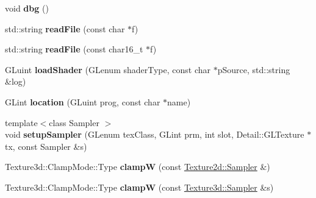 \begin{DoxyCompactItemize}
\item 
\hypertarget{struct_g_l_s_l_1_1_data_a7943d8b7dcde0fd9d68790e71e143011}{void {\bfseries dbg} ()}\label{struct_g_l_s_l_1_1_data_a7943d8b7dcde0fd9d68790e71e143011}

\item 
\hypertarget{struct_g_l_s_l_1_1_data_a85d85fdbcdb1fbdbf40941027060cce8}{std\+::string {\bfseries read\+File} (const char $\ast$f)}\label{struct_g_l_s_l_1_1_data_a85d85fdbcdb1fbdbf40941027060cce8}

\item 
\hypertarget{struct_g_l_s_l_1_1_data_a2917ec68a8f68e1ef2bf579e76977bbc}{std\+::string {\bfseries read\+File} (const char16\+\_\+t $\ast$f)}\label{struct_g_l_s_l_1_1_data_a2917ec68a8f68e1ef2bf579e76977bbc}

\item 
\hypertarget{struct_g_l_s_l_1_1_data_a041d67fbcc79c1f014f5c7284768bd99}{G\+Luint {\bfseries load\+Shader} (G\+Lenum shader\+Type, const char $\ast$p\+Source, std\+::string \&log)}\label{struct_g_l_s_l_1_1_data_a041d67fbcc79c1f014f5c7284768bd99}

\item 
\hypertarget{struct_g_l_s_l_1_1_data_a87b3e1e29a4a24273bdd7d37c5c93f2d}{G\+Lint {\bfseries location} (G\+Luint prog, const char $\ast$name)}\label{struct_g_l_s_l_1_1_data_a87b3e1e29a4a24273bdd7d37c5c93f2d}

\item 
\hypertarget{struct_g_l_s_l_1_1_data_a8fa7fbcb36d9df16e527ac415f287c31}{{\footnotesize template$<$class Sampler $>$ }\\void {\bfseries setup\+Sampler} (G\+Lenum tex\+Class, G\+Lint prm, int slot, Detail\+::\+G\+L\+Texture $\ast$tx, const Sampler \&s)}\label{struct_g_l_s_l_1_1_data_a8fa7fbcb36d9df16e527ac415f287c31}

\item 
\hypertarget{struct_g_l_s_l_1_1_data_a7e3dccd454744f69dd4d147401bbe545}{Texture3d\+::\+Clamp\+Mode\+::\+Type {\bfseries clamp\+W} (const \hyperlink{struct_tempest_1_1_texture2d_1_1_sampler}{Texture2d\+::\+Sampler} \&)}\label{struct_g_l_s_l_1_1_data_a7e3dccd454744f69dd4d147401bbe545}

\item 
\hypertarget{struct_g_l_s_l_1_1_data_ab4875596e2a3845cbdcfe9253fdb6c98}{Texture3d\+::\+Clamp\+Mode\+::\+Type {\bfseries clamp\+W} (const \hyperlink{struct_tempest_1_1_texture3d_1_1_sampler}{Texture3d\+::\+Sampler} \&s)}\label{struct_g_l_s_l_1_1_data_ab4875596e2a3845cbdcfe9253fdb6c98}


\end{DoxyCompactItemize}
